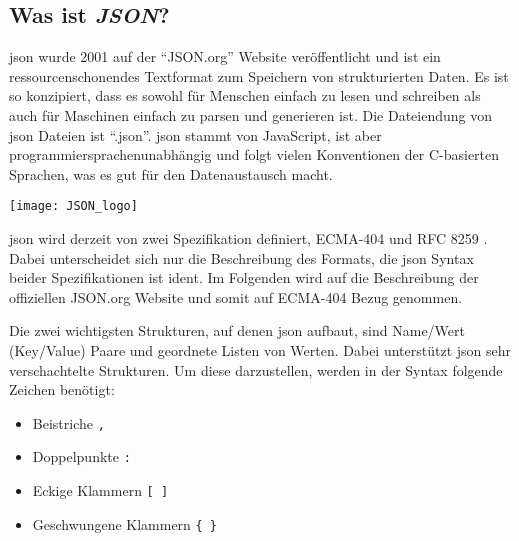 \subsection{Was ist \textit{JSON}?}\label{json_kapitel}
\begin{minipage}{0.6\textwidth}
	\acf{json} wurde 2001 auf der \enquote{JSON.org} Website veröffentlicht und ist ein ressourcenschonendes Textformat zum Speichern von strukturierten Daten. Es ist so konzipiert, dass es sowohl für Menschen einfach zu lesen und schreiben als auch für Maschinen einfach zu parsen und generieren ist. Die Dateiendung von \ac{json} Dateien ist \enquote{.json}. \ac{json} stammt von JavaScript, ist aber programmiersprachenunabhängig und folgt vielen Konventionen der C-basierten Sprachen, was es gut für den Datenaustausch macht. \cite[vgl.][]{json_org:o.J., ECMA:2017}
\end{minipage}%
\hfill
\begin{minipage}{0.37\textwidth}
	\centering	
	\texttt{[image: JSON\_logo]}
\end{minipage}
\vspace{1ex}

\ac{json} wird derzeit von zwei Spezifikation definiert, ECMA-404 \cite[vgl.][]{ECMA:2017} und RFC 8259 \cite[vgl.][]{Bray:2017}. Dabei unterscheidet sich nur die Beschreibung des Formats, die \ac{json} Syntax beider Spezifikationen ist ident. Im Folgenden wird auf die Beschreibung der offiziellen JSON.org Website \cite[vgl.][]{json_org:o.J.} und somit auf ECMA-404 \cite[vgl.][]{ECMA:2017} Bezug genommen.

Die zwei wichtigsten Strukturen, auf denen \ac{json} aufbaut, sind Name/Wert (\engl Key/Value) Paare und geordnete Listen von Werten. Dabei unterstützt \ac{json} sehr verschachtelte Strukturen. Um diese darzustellen, werden in der Syntax folgende Zeichen benötigt:
\begin{itemize}
	 \item Beistriche \lstinline|,|
	 \item Doppelpunkte \lstinline|:|
	 \item Eckige Klammern \lstinline|[ ]|
	 \item Geschwungene Klammern \lstinline|{ }|
\end{itemize}


